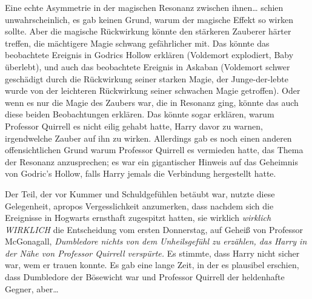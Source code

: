 Eine echte Asymmetrie in der magischen Resonanz zwischen ihnen… schien unwahrscheinlich, es gab keinen Grund, warum der magische Effekt so wirken sollte. Aber die magische Rückwirkung könnte den stärkeren Zauberer härter treffen, die mächtigere Magie schwang gefährlicher mit. Das könnte das beobachtete Ereignis in Godrics Hollow erklären (Voldemort explodiert, Baby überlebt), und auch das beobachtete Ereignis in Askaban (Voldemort schwer geschädigt durch die Rückwirkung seiner starken Magie, der Junge-der-lebte wurde von der leichteren Rückwirkung seiner schwachen Magie getroffen). Oder wenn es nur die Magie des Zaubers war, die in Resonanz ging, könnte das auch diese beiden Beobachtungen erklären. Das könnte sogar erklären, warum Professor Quirrell es nicht eilig gehabt hatte, Harry davor zu warnen, irgendwelche Zauber auf ihn zu wirken.
Allerdings gab es noch einen anderen offensichtlichen Grund warum Professor Quirrell es vermieden hatte, das Thema der Resonanz anzusprechen; es war ein gigantischer Hinweis auf das Geheimnis von Godric’s Hollow, falls Harry jemals die Verbindung hergestellt hatte.

Der Teil, der vor Kummer und Schuldgefühlen betäubt war, nutzte diese Gelegenheit, apropos Vergesslichkeit anzumerken, dass nachdem sich die Ereignisse in Hogwarts ernsthaft zugespitzt hatten,
sie wirklich \emph{wirklich WIRKLICH} die Entscheidung vom ersten Donnerstag, auf Geheiß von Professor McGonagall, \emph{Dumbledore nichts von dem Unheilsgefühl zu erzählen, das Harry in der Nähe von Professor Quirrell verspürte.} Es stimmte, dass Harry nicht sicher war, wem er trauen konnte. Es gab eine lange Zeit, in der es plausibel erschien, dass Dumbledore der Bösewicht war und Professor Quirrell der heldenhafte Gegner, aber…

